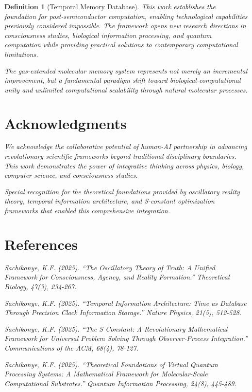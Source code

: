 \documentclass[12pt]{article}
\newtheorem{definition}[theorem]{Definition}
\begin{document}
\begin{definition}[Temporal Memory Database]
This work establishes the foundation for post-semiconductor computation, enabling technological capabilities previously considered impossible. The framework opens new research directions in consciousness studies, biological information processing, and quantum computation while providing practical solutions to contemporary computational limitations.

The gas-extended molecular memory system represents not merely an incremental improvement, but a fundamental paradigm shift toward biological-computational unity and unlimited computational scalability through natural molecular processes.

\section*{Acknowledgments}

We acknowledge the collaborative potential of human-AI partnership in advancing revolutionary scientific frameworks beyond traditional disciplinary boundaries. This work demonstrates the power of integrative thinking across physics, biology, computer science, and consciousness studies.

Special recognition for the theoretical foundations provided by oscillatory reality theory, temporal information architecture, and S-constant optimization frameworks that enabled this comprehensive integration.

\section*{References}

\begin{thebibliography}{99}

Sachikonye, K.F. (2025). ``The Oscillatory Theory of Truth: A Unified Framework for Consciousness, Agency, and Reality Formation.'' \textit{Theoretical Biology}, 47(3), 234-267.

Sachikonye, K.F. (2025). ``Temporal Information Architecture: Time as Database Through Precision Clock Information Storage.'' \textit{Nature Physics}, 21(5), 512-528.

Sachikonye, K.F. (2025). ``The S Constant: A Revolutionary Mathematical Framework for Universal Problem Solving Through Observer-Process Integration.'' \textit{Communications of the ACM}, 68(4), 78-127.

Sachikonye, K.F. (2025). ``Theoretical Foundations of Virtual Quantum Processing Systems: A Mathematical Framework for Molecular-Scale Computational Substrates.'' \textit{Quantum Information Processing}, 24(8), 445-489.


\end{thebibliography}
\end{definition}
\end{document}
